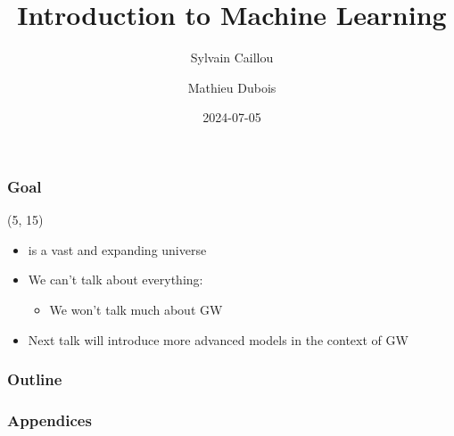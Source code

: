 \documentclass[10pt]{beamer}
\title{Introduction to Machine Learning}
\author{Sylvain Caillou \and Mathieu Dubois}
\institute{MaNiTou 2024}
\date{2024-07-05}
\begin{document}
\frame{\titlepage}


\begin{frame}
  \frametitle{Goal}

  \begin{textblock}{90}(5, 15)
    \begin{itemize}
    \item {} is a vast and expanding universe 
    \item<3-> We can't talk about everything:
      \begin{itemize}
      \item<4-> We won't talk much about GW
      \end{itemize}
    \item<5-> Next talk will introduce more advanced models in the context of GW
    \end{itemize}
  \end{textblock}
\end{frame}


\begin{frame}
  \frametitle{Outline}
  \tableofcontents[hidesubsections]
\end{frame}







%





\appendix

\begin{frame}
  \frametitle{Appendices}
  \tableofcontents[hidesubsections]
\end{frame}






%
\end{document}
